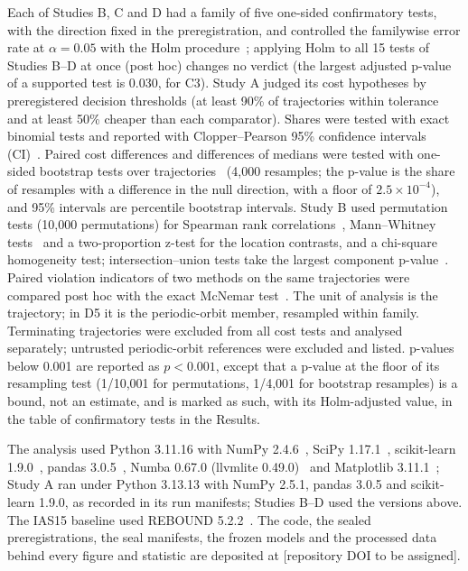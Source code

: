 \documentclass[10pt,letterpaper]{article}
\begin{document}
Each of Studies B, C and D had a family of five one-sided confirmatory tests, with the direction fixed in the preregistration, and controlled the familywise error rate at $\alpha = 0.05$ with the Holm procedure~\cite{holm1979}; applying Holm to all 15 tests of Studies B--D at once (post hoc) changes no verdict (the largest adjusted p-value of a supported test is 0.030, for C3). Study A judged its cost hypotheses by preregistered decision thresholds (at least 90\% of trajectories within tolerance and at least 50\% cheaper than each comparator). Shares were tested with exact binomial tests and reported with Clopper--Pearson 95\% confidence intervals (CI)~\cite{clopper1934}. Paired cost differences and differences of medians were tested with one-sided bootstrap tests over trajectories~\cite{efron1979} (4,000 resamples; the p-value is the share of resamples with a difference in the null direction, with a floor of $2.5\times10^{-4}$), and 95\% intervals are percentile bootstrap intervals. Study B used permutation tests (10,000 permutations) for Spearman rank correlations~\cite{spearman1904}, Mann--Whitney tests~\cite{mann1947} and a two-proportion z-test for the location contrasts, and a chi-square homogeneity test; intersection--union tests take the largest component p-value~\cite{berger1982}. Paired violation indicators of two methods on the same trajectories were compared post hoc with the exact McNemar test~\cite{mcnemar1947}. The unit of analysis is the trajectory; in D5 it is the periodic-orbit member, resampled within family. Terminating trajectories were excluded from all cost tests and analysed separately; untrusted periodic-orbit references were excluded and listed. p-values below 0.001 are reported as $p < 0.001$, except that a p-value at the floor of its resampling test (1/10,001 for permutations, 1/4,001 for bootstrap resamples) is a bound, not an estimate, and is marked as such, with its Holm-adjusted value, in the table of confirmatory tests in the Results.

The analysis used Python 3.11.16 with NumPy 2.4.6~\cite{harris2020}, SciPy 1.17.1~\cite{virtanen2020}, scikit-learn 1.9.0~\cite{pedregosa2011}, pandas 3.0.5~\cite{mckinney2010}, Numba 0.67.0 (llvmlite 0.49.0)~\cite{lam2015} and Matplotlib 3.11.1~\cite{hunter2007}; Study A ran under Python 3.13.13 with NumPy 2.5.1, pandas 3.0.5 and scikit-learn 1.9.0, as recorded in its run manifests; Studies B--D used the versions above. The IAS15 baseline used REBOUND 5.2.2~\cite{rein2012,rein2015}. The code, the sealed preregistrations, the seal manifests, the frozen models and the processed data behind every figure and statistic are deposited at [repository DOI to be assigned].
\end{document}
